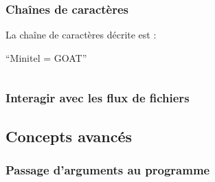\documentclass[../main.tex]{subfiles}
\begin{document}
\subsubsection{Chaînes de caractères}
 La chaîne de caractères décrite est : 
\begin{center}
``Minitel = GOAT''
\end{center}
\inputminted{c}{solutions/calculatrice.c}
\subsubsection{Interagir avec les flux de fichiers}
\subsection{Concepts avancés}
\subsubsection{Passage d'arguments au programme}
\inputminted{c}{solutions/list_args.c}
\inputminted{c}{solutions/cat.c}
\end{document}
